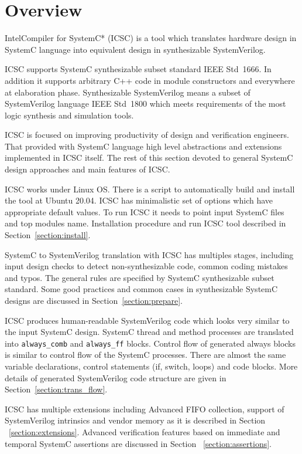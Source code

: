 \section{Overview}\label{section:overview}
Intel\textregistered Compiler for SystemC* (ICSC) is a tool which translates hardware design in SystemC language into equivalent design in synthesizable SystemVerilog. 

ICSC supports SystemC synthesizable subset standard IEEE Std~1666. In addition it supports arbitrary C++ code in module constructors and everywhere at elaboration phase.
%
Synthesizable SystemVerilog means a subset of SystemVerilog language IEEE Std~1800 which meets requirements of the most logic synthesis and simulation tools.

ICSC is focused on improving productivity of design and verification engineers. That provided with SystemC language high level abstractions and extensions implemented in ICSC itself. The rest of this section devoted to general SystemC design approaches and main features of ICSC. 

ICSC works under Linux OS. There is a script to automatically build and install the tool at Ubuntu 20.04. ICSC has minimalistic set of options which have appropriate default values. To run ICSC it needs to point input SystemC files and top modules name. Installation procedure and run ICSC tool described in Section~\ref{section:install}.   

SystemC to SystemVerilog translation with ICSC has multiples stages, including input design checks to detect non-synthesizable code, common coding mistakes and typos. The general rules are specified by SystemC synthesizable subset standard. Some good practices and common cases in synthesizable SystemC designs are discussed in Section~\ref{section:prepare}.  

ICSC produces human-readable SystemVerilog code which looks very similar to the input SystemC design. SystemC thread and method processes are translated into {\tt always\_comb} and {\tt always\_ff} blocks. Control flow of generated always blocks is similar to control flow of the SystemC processes. There are almost the same variable declarations, control statements (if, switch, loops) and code blocks. More details of generated SystemVerilog code structure are given in Section~\ref{section:trans_flow}.

ICSC has multiple extensions including Advanced FIFO collection, support of SystemVerilog intrinsics and vendor memory as it is described in Section ~\ref{section:extensions}. Advanced verification features based on immediate and temporal SystemC assertions are discussed in Section ~\ref{section:assertions}.

